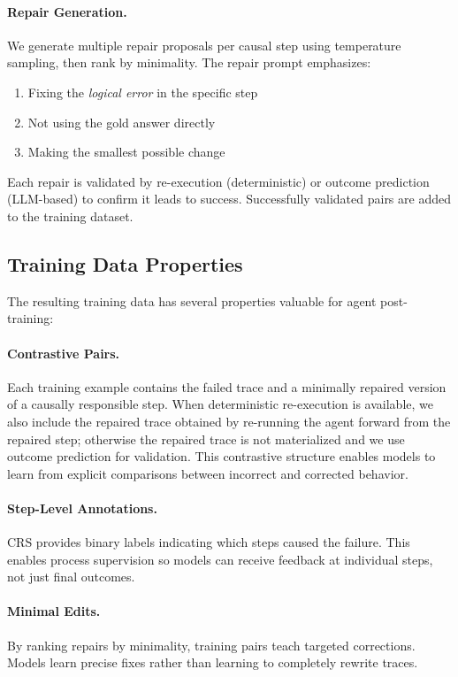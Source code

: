 \documentclass{article}
\theoremstyle{plain}
\theoremstyle{definition}
\theoremstyle{remark}
\begin{document}
\paragraph{Repair Generation.}
We generate multiple repair proposals per causal step using temperature sampling, then rank by minimality. The repair prompt emphasizes:
\begin{enumerate}
    \item Fixing the \emph{logical error} in the specific step
    \item Not using the gold answer directly
    \item Making the smallest possible change
\end{enumerate}

Each repair is validated by re-execution (deterministic) or outcome prediction (LLM-based) to confirm it leads to success. Successfully validated pairs are added to the training dataset.

\subsection{Training Data Properties}

The resulting training data has several properties valuable for agent post-training:

\paragraph{Contrastive Pairs.} Each training example contains the failed trace and a minimally repaired version of a causally responsible step. When deterministic re-execution is available, we also include the repaired trace obtained by re-running the agent forward from the repaired step; otherwise the repaired trace is not materialized and we use outcome prediction for validation. This contrastive structure enables models to learn from explicit comparisons between incorrect and corrected behavior.

\paragraph{Step-Level Annotations.} CRS provides binary labels indicating which steps caused the failure. This enables process supervision so models can receive feedback at individual steps, not just final outcomes.

\paragraph{Minimal Edits.} By ranking repairs by minimality, training pairs teach targeted corrections. Models learn precise fixes rather than learning to completely rewrite traces.
\end{document}
